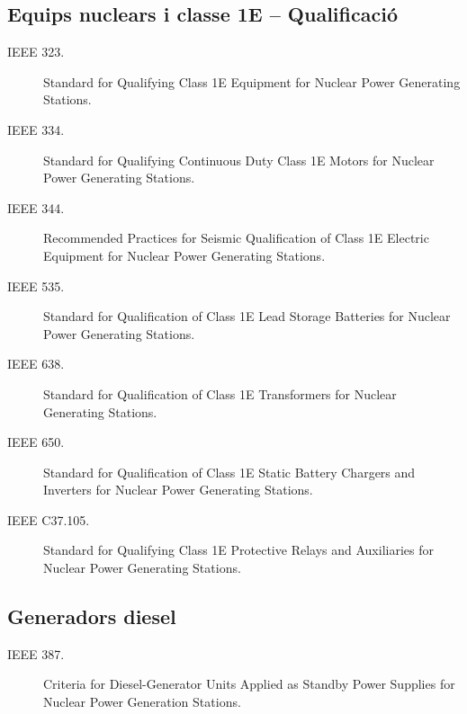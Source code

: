 \subsection*{Equips nuclears i classe 1E -- Qualificació}
\begin{description}
    \item [\hspace{5mm}IEEE 323.] Standard for Qualifying Class 1E Equipment for Nuclear Power Generating Stations.
    \item [\hspace{5mm}IEEE 334.] Standard for Qualifying Continuous Duty Class 1E Motors for Nuclear Power Generating Stations.
    \item [\hspace{5mm}IEEE 344.] Recommended Practices for Seismic Qualification of Class 1E Electric Equipment for Nuclear Power Generating Stations.
    \item [\hspace{5mm}IEEE 535.]  Standard for Qualification of Class 1E Lead Storage Batteries for Nuclear Power Generating Stations. 
    \item [\hspace{5mm}IEEE 638.] Standard for Qualification of Class 1E Transformers for Nuclear Generating Stations.
    \item [\hspace{5mm}IEEE 650.] Standard for Qualification of Class 1E Static Battery Chargers and Inverters for Nuclear Power Generating Stations.
    \item [\hspace{5mm}IEEE C37.105.] Standard for Qualifying Class 1E Protective Relays and Auxiliaries for Nuclear Power Generating Stations.
\end{description}


\subsection*{Generadors diesel}
\begin{description}
    \item [\hspace{5mm}IEEE 387.] Criteria for Diesel-Generator Units Applied as Standby Power Supplies for Nuclear Power Generation Stations.
\end{description}


